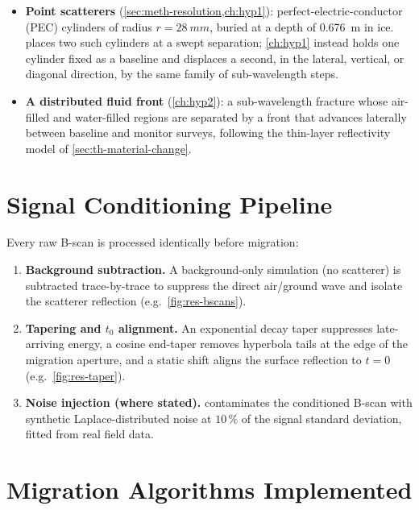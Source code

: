 \begin{itemize}
  \item \textbf{Point scatterers} (\cref{sec:meth-resolution,ch:hyp1}):
    perfect-electric-conductor (PEC) cylinders of radius $r=\SI{28}{mm}$,
    buried at a depth of \SI{0.676}{m} in ice. 
    places two such cylinders at a swept separation; \cref{ch:hyp1} instead
    holds one cylinder fixed as a baseline and displaces a second, in the
    lateral, vertical, or diagonal direction, by the same family of
    sub-wavelength steps.
  \item \textbf{A distributed fluid front} (\cref{ch:hyp2}): a
    sub-wavelength fracture whose air-filled and water-filled regions are
    separated by a front that advances laterally between baseline and
    monitor surveys, following the thin-layer reflectivity model of
    \cref{sec:th-material-change}.
\end{itemize}

\section{Signal Conditioning Pipeline}
\label{sec:meth-conditioning}

Every raw B-scan is processed identically before migration:
\begin{enumerate}
  \item \textbf{Background subtraction.} A background-only simulation (no
    scatterer) is subtracted trace-by-trace to suppress the direct
    air/ground wave and isolate the scatterer reflection
    (e.g.\ \cref{fig:res-bscans}).
  \item \textbf{Tapering and $t_0$ alignment.} An exponential decay taper
    suppresses late-arriving energy, a cosine end-taper removes hyperbola
    tails at the edge of the migration aperture, and a static shift aligns
    the surface reflection to $t=0$ (e.g.\ \cref{fig:res-taper}).
  \item \textbf{Noise injection (where stated).}  contaminates
    the conditioned B-scan with synthetic Laplace-distributed noise at
    $10\,\%$ of the signal standard deviation, fitted from real field data.
\end{enumerate}

\section{Migration Algorithms Implemented}

